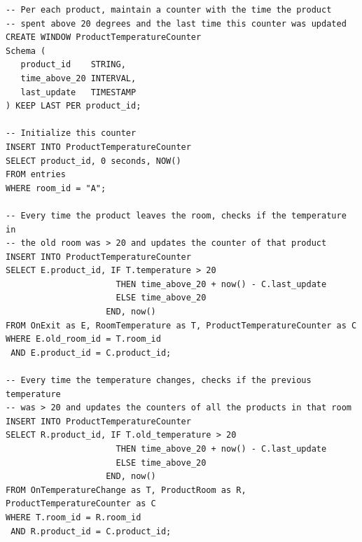 \documentclass{report}
\begin{document}
\begin{verbatim}
-- Per each product, maintain a counter with the time the product
-- spent above 20 degrees and the last time this counter was updated
CREATE WINDOW ProductTemperatureCounter
Schema (
   product_id    STRING,
   time_above_20 INTERVAL,
   last_update   TIMESTAMP
) KEEP LAST PER product_id;

-- Initialize this counter
INSERT INTO ProductTemperatureCounter
SELECT product_id, 0 seconds, NOW()
FROM entries
WHERE room_id = "A";

-- Every time the product leaves the room, checks if the temperature in
-- the old room was > 20 and updates the counter of that product
INSERT INTO ProductTemperatureCounter
SELECT E.product_id, IF T.temperature > 20
                      THEN time_above_20 + now() - C.last_update
                      ELSE time_above_20
                    END, now()
FROM OnExit as E, RoomTemperature as T, ProductTemperatureCounter as C
WHERE E.old_room_id = T.room_id
 AND E.product_id = C.product_id;

-- Every time the temperature changes, checks if the previous temperature
-- was > 20 and updates the counters of all the products in that room
INSERT INTO ProductTemperatureCounter
SELECT R.product_id, IF T.old_temperature > 20
                      THEN time_above_20 + now() - C.last_update
                      ELSE time_above_20
                    END, now()
FROM OnTemperatureChange as T, ProductRoom as R, ProductTemperatureCounter as C
WHERE T.room_id = R.room_id
 AND R.product_id = C.product_id;
\end{verbatim}
\end{document}
